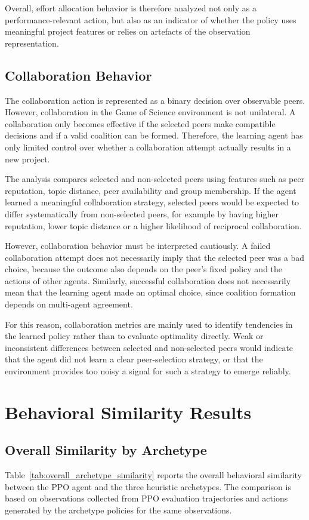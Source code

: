 \documentclass[english,bachelor]{hsluthesis}
\begin{document}
Overall, effort allocation behavior is therefore analyzed not only as a performance-relevant action, but also as an indicator of whether the policy uses meaningful project features or relies on artefacts of the observation representation.

\subsection{Collaboration Behavior}

The collaboration action is represented as a binary decision over observable peers. However, collaboration in the Game of Science environment is not unilateral. A collaboration only becomes effective if the selected peers make compatible decisions and if a valid coalition can be formed. Therefore, the learning agent has only limited control over whether a collaboration attempt actually results in a new project.

The analysis compares selected and non-selected peers using features such as peer reputation, topic distance, peer availability and group membership. If the agent learned a meaningful collaboration strategy, selected peers would be expected to differ systematically from non-selected peers, for example by having higher reputation, lower topic distance or a higher likelihood of reciprocal collaboration.

However, collaboration behavior must be interpreted cautiously. A failed collaboration attempt does not necessarily imply that the selected peer was a bad choice, because the outcome also depends on the peer's fixed policy and the actions of other agents. Similarly, successful collaboration does not necessarily mean that the learning agent made an optimal choice, since coalition formation depends on multi-agent agreement.

For this reason, collaboration metrics are mainly used to identify tendencies in the learned policy rather than to evaluate optimality directly. Weak or inconsistent differences between selected and non-selected peers would indicate that the agent did not learn a clear peer-selection strategy, or that the environment provides too noisy a signal for such a strategy to emerge reliably.

\section{Behavioral Similarity Results}

\subsection{Overall Similarity by Archetype}
Table~\ref{tab:overall_archetype_similarity} reports the overall behavioral similarity between the PPO agent and the three heuristic archetypes. The comparison is based on observations collected from PPO evaluation trajectories and actions generated by the archetype policies for the same observations.
\end{document}
